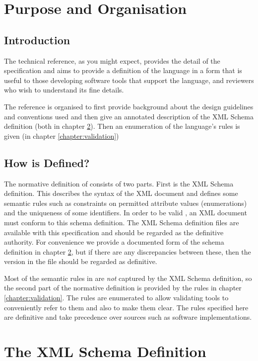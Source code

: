 \chapter{Purpose and Organisation}

\section{Introduction}

The technical reference, as you might expect, provides the detail
of the \pharmml specification and aims to provide a definition of the
language in a form that is useful to those developing software tools
that support the language, and reviewers who wish to understand its
fine details.

The reference is organised to first provide background about the design
guidelines and conventions used and then give an annotated description
of the XML Schema definition (both in chapter \ref{techchap:design}).
Then an enumeration of the language's rules is given (in chapter \ref{chapter:validation})

\section{How is \pharmml Defined?}

The normative definition of \pharmml consists of two parts. First is
the XML Schema definition. This describes the syntax of the XML
document and defines some semantic rules such as constraints on
permitted attribute values (enumerations) and the uniqueness of some
identifiers. In order to be valid \pharmml, an XML document must conform to
this schema definition. The XML Schema definition files are
available with this specification and should be regarded as the
definitive authority. For convenience we provide a documented form of
the schema definition in chapter \ref{techchap:design}, but if there
are any discrepancies between these, then the version in the file should
be regarded as definitive.

Most of the semantic rules in \pharmml are \emph{not} captured by the XML
Schema definition, so the second part of the normative definition
is provided by the rules in chapter \ref{chapter:validation}. The rules
are enumerated to allow validating tools to conveniently refer to them
and also to make them clear. The rules specified here are definitive
and take precedence over sources such as software implementations.


\chapter{The XML Schema Definition}
\label{techchap:design}
\label{chap:design}

